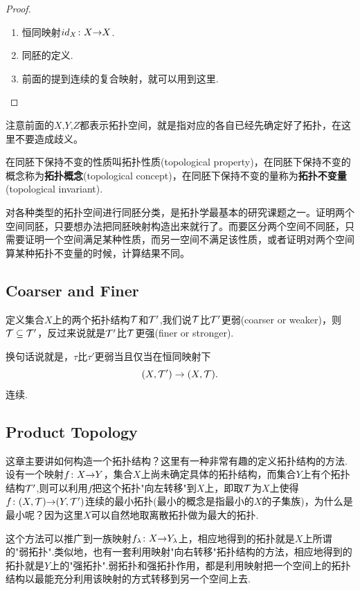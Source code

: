 \begin{proof}
\begin{enumerate}
	\item 恒同映射${id_X}\colon{X}{\to}{X}$.
	\item 同胚的定义.
	\item 前面的提到连续的复合映射，就可以用到这里.
\end{enumerate}
\end{proof}

注意前面的$X$,$Y$,$Z$都表示拓扑空间，就是指对应的各自已经先确定好了拓扑，在这里不要造成歧义。

\begin{definition}
在同胚下保持不变的性质叫拓扑性质(topological property)，在同胚下保持不变的概念称为\textbf{拓扑概念}(topological concept)，在同胚下保持不变的量称为\textbf{拓扑不变量}(topological invariant).
\end{definition}

对各种类型的拓扑空间进行同胚分类，是拓扑学最基本的研究课题之一。证明两个空间同胚，只要想办法把同胚映射构造出来就行了。而要区分两个空间不同胚，只需要证明一个空间满足某种性质，而另一空间不满足该性质，或者证明对两个空间算某种拓扑不变量的时候，计算结果不同。

\newpage
\subsection{Coarser and Finer}

\begin{definition}
定义集合$X$上的两个拓扑结构$\mathcal{T}$和$\mathcal{T}'$,我们说$\mathcal{T}$比$\mathcal{T}'$更弱(coarser or weaker)，则$\mathcal{T} \subseteq \mathcal{T}'$，反过来说就是$\mathcal{T}'$比$\mathcal{T}$更强(finer or stronger).

换句话说就是，$\tau$比$\tau'$更弱当且仅当在恒同映射下 \[ (X,\mathcal{T}') \rightarrow (X,\mathcal{T}).\]连续.
\end{definition}


\newpage
\subsection{Product Topology}
这章主要讲如何构造一个拓扑结构？这里有一种非常有趣的定义拓扑结构的方法.设有一个映射${f}\colon{X}{\to}{Y}$，集合$X$上尚未确定具体的拓扑结构，而集合$Y$上有个拓扑结构$\mathcal{T}'$,则可以利用$f$把这个拓扑"向左转移"到$X$上，即取$\mathcal{T}$为$X$上使得${f}\colon{(X,\mathcal{T})}{\to}{(Y,\mathcal{T}')}$连续的最小拓扑(最小的概念是指最小的$X$的子集族)，为什么是最小呢？因为这里$X$可以自然地取离散拓扑做为最大的拓扑.

这个方法可以推广到一族映射${f_\lambda}\colon{X}{\to}{Y_\lambda}$上，相应地得到的拓扑就是$X$上所谓的"弱拓扑".类似地，也有一套利用映射"向右转移"拓扑结构的方法，相应地得到的拓扑就是$Y$上的"强拓扑".弱拓扑和强拓扑作用，都是利用映射把一个空间上的拓扑结构以最能充分利用该映射的方式转移到另一个空间上去.

